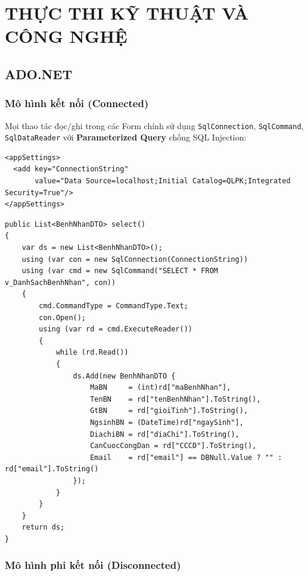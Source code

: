\documentclass[12pt,a4paper]{report}
\begin{document}
\chapter{THỰC THI KỸ THUẬT VÀ CÔNG NGHỆ}

\section{ADO.NET}

\subsection{Mô hình kết nối (Connected)}

Mọi thao tác đọc/ghi trong các Form chính sử dụng \texttt{SqlConnection}, \texttt{SqlCommand}, \texttt{SqlDataReader} với \textbf{Parameterized Query} chống SQL Injection:

\begin{lstlisting}[caption={Cấu hình chuỗi kết nối trong App.config}]
<appSettings>
  <add key="ConnectionString"
       value="Data Source=localhost;Initial Catalog=QLPK;Integrated Security=True"/>
</appSettings>
\end{lstlisting}

\begin{lstlisting}[style=csharp,caption={DAL gọi View qua ADO.NET (mô hình kết nối)}]
public List<BenhNhanDTO> select()
{
    var ds = new List<BenhNhanDTO>();
    using (var con = new SqlConnection(ConnectionString))
    using (var cmd = new SqlCommand("SELECT * FROM v_DanhSachBenhNhan", con))
    {
        cmd.CommandType = CommandType.Text;
        con.Open();
        using (var rd = cmd.ExecuteReader())
        {
            while (rd.Read())
            {
                ds.Add(new BenhNhanDTO {
                    MaBN     = (int)rd["maBenhNhan"],
                    TenBN    = rd["tenBenhNhan"].ToString(),
                    GtBN     = rd["gioiTinh"].ToString(),
                    NgsinhBN = (DateTime)rd["ngaySinh"],
                    DiachiBN = rd["diaChi"].ToString(),
                    CanCuocCongDan = rd["CCCD"].ToString(),
                    Email    = rd["email"] == DBNull.Value ? "" : rd["email"].ToString()
                });
            }
        }
    }
    return ds;
}
\end{lstlisting}

\subsection{Mô hình phi kết nối (Disconnected)}
\end{document}
